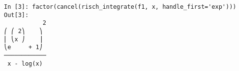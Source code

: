 ﻿\documentclass{article}
\begin{document}
\normalsize
\begin{Verbatim}
In [3]: factor(cancel(risch_integrate(f1, x, handle_first='exp')))
Out[3]: 
           2
⎛ ⎛ 2⎞    ⎞ 
⎜ ⎝x ⎠    ⎟ 
⎝e     + 1⎠ 
────────────
 x - log(x) 
\end{Verbatim}
\end{document}
